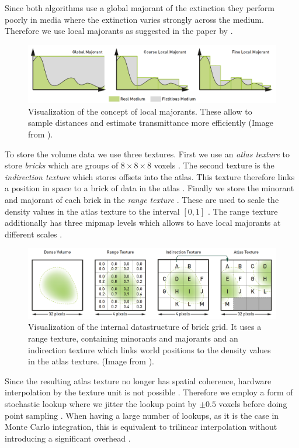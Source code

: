 Since both algorithms use a global majorant of the extinction they perform poorly in media where the extinction varies strongly across the medium.
Therefore we use local majorants as suggested in the paper  by \citeauthor{brick_grid} \cite{brick_grid}.
\begin{figure}[ht]
    \centering
    \includegraphics[width=0.9\linewidth]{img/brick_grid_majorants.png}
    \caption[Visualization of local density majorants]{Visualization of the concept of local majorants. These allow to sample distances and estimate transmittance more efficiently (Image from \cite{brick_grid}).}
    \label{fig:brick_grid_datastructure}
\end{figure}
To store the volume data we use three textures.
First we use an \textit{atlas texture} to store \textit{bricks} which are groups of $8 \times 8 \times 8$ voxels \cite{brick_grid}.
The second texture is the \textit{indirection texture} which stores offsets into the atlas.
This texture therefore links a position in space to a brick of data in the atlas \cite{brick_grid}.
Finally we store the minorant and majorant of each brick in the \textit{range texture} \cite{brick_grid}.
These are used to scale the density values in the atlas texture to the interval $[0, 1]$ \cite{brick_grid}.
The range texture additionally has three mipmap levels which allows to have local majorants at different scales \cite{brick_grid}.
\begin{figure}[ht]
    \centering
    \includegraphics[width=0.9\linewidth]{img/brick_grid_datastructure.png}
    \caption[Datastructure of brick grid]{Visualization of the internal datastructure of brick grid. It uses a range texture, containing minorants and majorants and an indirection texture which links world positions to the density values in the atlas texture. (Image from \cite{brick_grid}).}
    \label{fig:brick_grid_datastructure}
\end{figure}
Since the resulting atlas texture no longer has spatial coherence, hardware interpolation by the texture unit is not possible \cite{brick_grid}.
Therefore we employ a form of stochastic lookup where we jitter the lookup point by $\pm0.5$ voxels before doing point sampling \cite{brick_grid}.
When having a large number of lookups, as it is the case in Monte Carlo integration, this is equivalent to trilinear interpolation without introducing a significant overhead \cite{brick_grid}.

